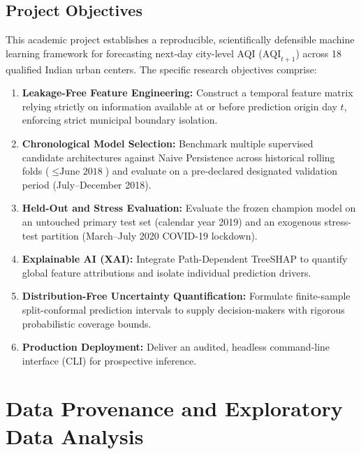 \documentclass[11pt,a4paper]{report}
\begin{document}
\section{Project Objectives}
This academic project establishes a reproducible, scientifically defensible machine learning framework for forecasting next-day city-level AQI ($\text{AQI}_{t+1}$) across 18 qualified Indian urban centers. The specific research objectives comprise:
\begin{enumerate}
    \item \textbf{Leakage-Free Feature Engineering:} Construct a temporal feature matrix relying strictly on information available at or before prediction origin day $t$, enforcing strict municipal boundary isolation.
    \item \textbf{Chronological Model Selection:} Benchmark multiple supervised candidate architectures against Naive Persistence across historical rolling folds ($\le \text{June 2018}$) and evaluate on a pre-declared designated validation period (July--December 2018).
    \item \textbf{Held-Out and Stress Evaluation:} Evaluate the frozen champion model on an untouched primary test set (calendar year 2019) and an exogenous stress-test partition (March--July 2020 COVID-19 lockdown).
    \item \textbf{Explainable AI (XAI):} Integrate Path-Dependent TreeSHAP to quantify global feature attributions and isolate individual prediction drivers.
    \item \textbf{Distribution-Free Uncertainty Quantification:} Formulate finite-sample split-conformal prediction intervals to supply decision-makers with rigorous probabilistic coverage bounds.
    \item \textbf{Production Deployment:} Deliver an audited, headless command-line interface (CLI) for prospective inference.
\end{enumerate}


\chapter{Data Provenance and Exploratory Data Analysis}
\end{document}
